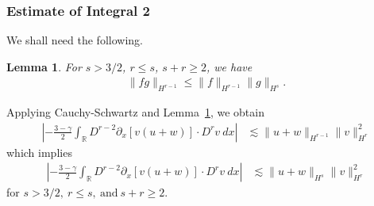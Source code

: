 \documentclass[12pt,reqno]{amsart}
\numberwithin{equation}{section}  %
\numberwithin{figure}{section}
\newcommand{\rr}{\mathbb{R}}
\newcommand{\p}{\partial}
\newtheorem{lemma}[theorem]{Lemma}
\begin{document}
\subsubsection{Estimate of Integral 2} We shall need the following.
%
%
%
%
%
%
%
%
\begin{lemma}
For $s > 3/2$, $r \le s$, $s + r \ge 2$, we have
%
%
\begin{equation*}
\begin{split}
  \| fg \|_{H^{r-1}} \le \| f \|_{H^{r-1}} \| g \|_{H^{s}}.
\end{split}
\end{equation*}
%
%
\label{lem:frac-deriv}
\end{lemma}
%
%
%
%
%
%
Applying Cauchy-Schwartz and Lemma~\ref{lem:frac-deriv}, we obtain
%
%
%
\begin{equation*}
\begin{split}
\left | - \frac{3-\gamma}{2} \int_{\rr}  D^{r -2}
\p_x[v(u+w)] \cdot
D^r v \ dx  \right |
 & \lesssim \|u+w\|_{H^{r -1}} \|v\|_{H^r}^2
\end{split}
\end{equation*}
%
%
which implies
\begin{equation}
\begin{split}
\left | - \frac{3-\gamma}{2} \int_{\rr}  D^{r -2}
\p_x[v(u+w)] \cdot
D^r v \ dx  \right |
 & \lesssim \|u+w\|_{H^{s}} \|v\|_{H^r}^2
 \label{3v}
\end{split}
\end{equation}
%
for $s > 3/2, \ r \le s, \ \text{and} \ s + r \ge 2$.
%
%
\end{document}

